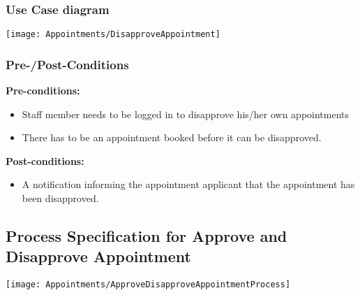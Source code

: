 \subsubsection{Use Case diagram}
\texttt{[image: Appointments/DisapproveAppointment]}

\subsubsection{Pre-/Post-Conditions}
\textbf{Pre-conditions:} 
	\begin{itemize}
		\item Staff member needs to be logged in to disapprove his/her own appointments
		\item There has to be an appointment booked before it can be disapproved.
	\end{itemize}
\textbf{ Post-conditions:} 
	\begin{itemize}
		\item A notification informing the appointment applicant that the appointment has been disapproved.
	\end{itemize}	

\subsection{Process Specification for Approve and Disapprove Appointment}
	\texttt{[image: Appointments/ApproveDisapproveAppointmentProcess]}	